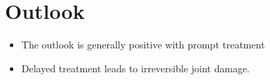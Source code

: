 \section{Outlook}
\begin{itemize}[noitemsep]
  \item The outlook is generally positive with prompt treatment
  \item Delayed treatment leads to irreversible joint damage.
\end{itemize}
